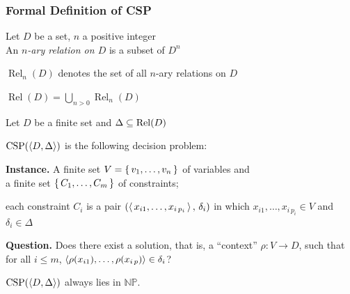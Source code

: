 \documentclass[12pt,xcolor=dvipsnames,mathserif%
   ]{beamer}
\DeclareMathOperator{\Rel}{Rel}
\DeclareMathOperator{\CSP}{CSP}
\newcommand{\FF}{\mathbb{F}}
\renewcommand{\.}{\cdot}
\newcommand{\NP}{\ensuremath{\mathbb{NP}}\xspace}
\begin{document}
\begin{frame}
  \frametitle{Formal Definition of CSP}

  Let $D$ be a set, $n$ a positive integer\\
  An \emph{$n$-ary relation on $D$} is a subset of $D^n$

  \pause
  $\Rel_n(D)$ denotes the set of all $n$-ary relations on $D$

  $\Rel(D) = \bigcup\limits_{n>0} \Rel_n(D)$
\end{frame}

\begin{frame}
  Let $D$ be a finite set and $\Delta\sseq \Rel(D)$

  $\CSP(\<D,\Delta\>)$ is the following decision problem:

  \textbf{Instance.} A finite set $V=\left\{\,v_1,\dots,v_n\,\right\}$ of
    \alert{variables}
    and\\
    a finite set $\left\{\,C_1,\dots,C_m\,\right\}$ of \alert{constraints};

    each constraint $C_i$ is a pair $(\left\langle\,x_{i1},\dots,x_{i\,p_i}\,\right\rangle,\,
    \delta_i)$ in which $x_{i1},\dots,x_{i\,p_i} \in V$ and $\delta_i\in
    \Delta$

    \pause
    \textbf{Question.} Does there exist a \alert{solution}, that is,
    a ``context''  $\rho \colon V\to D$, such
    that for all $i\leq m$, $\langle\rho(x_{i1}),\dots,\rho(x_{i\,p})\rangle\in \delta_i$?

    \pause
    $\CSP(\<D,\Delta\>)$ always lies in \NP.

\end{frame}

\end{document}
